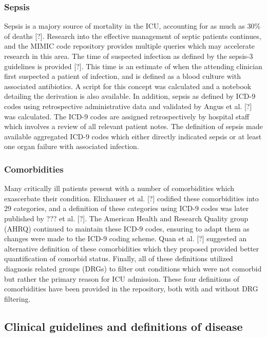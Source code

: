 \documentclass{elsart}
\begin{document}
\subsubsection{Sepsis}

Sepsis is a majory source of mortality in the ICU, accounting for as much as 30\% of deaths [?]. Research into the effective management of septic patients continues, and the MIMIC code repository provides multiple queries which may accelerate research in this area. The time of suspected infection as defined by the sepsis-3 guidelines is provided [?]. This time is an estimate of when the attending clinician first suspected a patient of infection, and is defined as a blood culture with associated antibiotics. A script for this concept was calculated and a notebook detailing the derivation is also available. In addition, sepsis as defined by ICD-9 codes using retrospective administrative data and validated by Angus et al. [?] was calculated. The ICD-9 codes are assigned retrospectively by hospital staff which involves a review of all relevant patient notes. The definition of sepsis made available aggregated ICD-9 codes which either directly indicated sepsis or at least one organ failure with associated infection.

\subsubsection{Comorbidities}

Many critically ill patients present with a number of comorbidities which exascerbate their condition. Elixhauser et al. [?] codified these comorbidities into 29 categories, and a definition of these categories using ICD-9 codes was later published by ??? et al. [?]. The American Health and Research Quality group (AHRQ) continued to maintain these ICD-9 codes, ensuring to adapt them as changes were made to the ICD-9 coding scheme. Quan et al. [?] suggested an alternative definition of these comorbidities which they proposed provided better quantification of comorbid status. Finally, all of these definitions utilized diagnosis related groups (DRGs) to filter out conditions which were not comorbid but rather the primary reason for ICU admission. These four definitions of comorbidities have been provided in the repository, both with and without DRG filtering.


\subsection{Clinical guidelines and definitions of disease}
\end{document}
